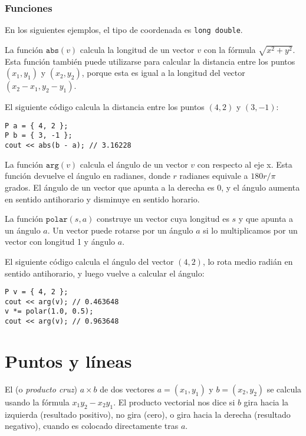 \subsubsection*{Funciones}

En los siguientes ejemplos, el tipo de coordenada es \texttt{long double}.

La función $\texttt{abs}(v)$ calcula la longitud de un vector $v$ con la
fórmula $\sqrt{x^2+y^2}$. Esta función también puede utilizarse para calcular
la distancia entre los puntos $(x_1,y_1)$ y $(x_2,y_2)$, porque esta es igual
a la longitud del vector $(x_2-x_1,y_2-y_1)$.

El siguiente código calcula la distancia entre los puntos $(4,2)$ y $(3,-1)$:
\begin{lstlisting}
P a = { 4, 2 };
P b = { 3, -1 };
cout << abs(b - a); // 3.16228
\end{lstlisting}

La función $\texttt{arg}(v)$ calcula el ángulo de un vector $v$ con
respecto al eje x. Esta función devuelve el ángulo en radianes, donde $r$
radianes equivale a $180 r/\pi$ grados. El ángulo de un vector que apunta
a la derecha es 0, y el ángulo aumenta en sentido antihorario y disminuye
en sentido horario.

La función $\texttt{polar}(s,a)$ construye un vector cuya longitud es $s$
y que apunta a un ángulo $a$. Un vector puede rotarse por un ángulo $a$ si
lo multiplicamos por un vector con longitud 1 y ángulo $a$.

El siguiente código calcula el ángulo del vector $(4,2)$, lo rota medio
radián en sentido antihorario, y luego vuelve a calcular el ángulo:

\begin{lstlisting}
P v = { 4, 2 };
cout << arg(v); // 0.463648
v *= polar(1.0, 0.5);
cout << arg(v); // 0.963648
\end{lstlisting}

\section{Puntos y líneas}


El  (o \textit{producto cruz}) $a \times b$ de dos
vectores $a=(x_1,y_1)$ y $b=(x_2,y_2)$ se calcula usando la fórmula
$x_1 y_2 - x_2 y_1$. El producto vectorial nos dice si $b$ gira hacia la
izquierda (resultado positivo), no gira (cero), o gira hacia la derecha
(resultado negativo), cuando es colocado directamente tras $a$.

